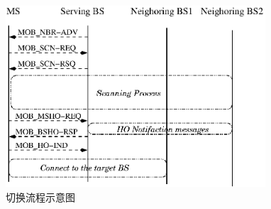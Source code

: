 \begin{figure}[t]
\centering
\includegraphics[height=6.75cm]{iccs_handover}
\caption{切换流程示意图}
\label{fig:chap_iccs_handover_algorithm_handover_flow}
\end{figure}

